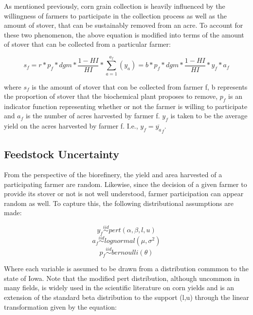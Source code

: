 \documentclass[12pt]{article}\usepackage[]{graphicx}\usepackage[]{color}
\begin{document}
As mentioned previously, corn grain collection is heavily influenced by the willingness of farmers to participate in the collection process as well as the amount of stover, that can be sustainably removed from an acre.  To account for these two phenomenon, the above equation is modified into terms of the amount of stover that can be collected from a particular farmer:

\begin{equation}\tag{3}
s_f= r*p_f*dgm * \frac{1-HI}{HI}* \sum_{a=1}^{a_f} (y_a)  = b*p_f*dgm*\frac{1-HI}{HI}*y_f*a_f
\end{equation}

where $s_f$ is the amount of stover that con be collected from farmer f, b represents the proportion of stover that the biochemical plant proposes to remove, $p_f$ is an indicator function representing whether or not the farmer is willing to participate and $a_f$ is the number of acres harvested by farmer f.  $y_f$ is taken to be the average yield on the acres harvested by farmer f.  I.e., $y_f=\overline{y_a}_f$.

\subsection{Feedstock Uncertainty}

From the perspective of the biorefinery, the yield and area harvested of a participating farmer are random.  Likewise, since the decision of a given farmer to provide its stover or not is not well understood, farmer participation can appear random as well.  To capture this, the following distributional assumptions are made:

\begin{equation}\tag{4}
y_f \stackrel{iid}{\sim} pert(\alpha,\beta,l,u)
\end{equation}
\begin{equation}\tag{5}
a_f \stackrel{iid}{\sim} lognormal(\mu, \sigma^2)
\end{equation}
\begin{equation}\tag{6}
p_f \stackrel{iid}{\sim} bernoulli(\theta)
\end{equation}

Where each variable is assumed to be drawn from a distribution commmon to the state of Iowa.  Note that the modified pert distribution, although uncommon in many fields, is widely used in the scientific literature on corn yields and is an extension of the standard beta distribution to the support (l,u) through the linear transformation given by the equation:
\end{document}
